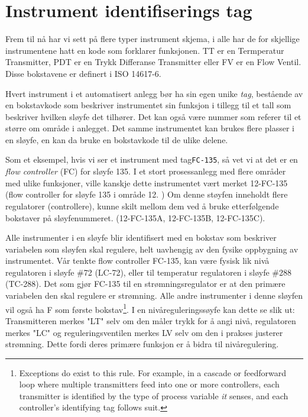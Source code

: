 \filbreak
\section{Instrument identifiserings tag} 

Frem til nå har vi sett på flere typer instrument skjema, i alle har de for skjellige instrumentene hatt en kode som forklarer funksjonen. TT er en Termperatur Transmitter, PDT er en Trykk Differanse Transmitter eller FV er en Flow Ventil. Disse bokstavene er definert i ISO 14617-6. 

Hvert instrument i et automatisert anlegg bør ha sin egen unike \textit{tag}, bestående av en bokstavkode som beskriver instrumentet sin funksjon i tillegg til et tall som beskriver hvilken sløyfe det tilhører. Det kan også være nummer som referer til et større om område i anlegget. Det samme instrumentet kan brukes flere plasser i en sløyfe, en kan da bruke en bokstavkode til de ulike delene.  

Som et eksempel, hvis vi ser et instrument med tag\texttt{FC-135}, så vet vi at det er en \textit{flow controller} (FC) for sløyfe 135. I et stort prosessanlegg med flere områder med ulike funksjoner, ville kanskje dette instrumentet vært merket 12-FC-135 (flow controller for sløyfe 135 i område 12. ) Om denne støyfen inneholdt flere regulatorer (controllere), kunne skilt mellom dem ved å bruke etterfølgende bokstaver på sløyfenummeret. (12-FC-135A, 12-FC-135B, 12-FC-135C). 

Alle instrumenter i en sløyfe blir identifisert med en bokstav som beskriver variabelen som sløyfen skal regulere, helt uavhengig av den fysike oppbygning av instrumentet. Vår tenkte flow controller FC-135, kan være fysisk lik nivå regulatoren i sløyfe \#72 (LC-72), eller til temperatur regulatoren i sløyfe \#288 (TC-288). Det som gjør FC-135 til en strømningsregulator er at den primære variabelen den skal regulere er strømning. Alle andre instrumenter i denne sløyfen vil også ha F som første bokstav\footnote{Exceptions do exist to this rule.  For example, in a cascade or feedforward loop where multiple transmitters feed into one or more controllers, each transmitter is identified by the type of process variable \textit{it} senses, and each controller's identifying tag follows suit.}. I en nivåreguleringssøyfe kan dette se slik ut: Transmitteren merkes "LT" selv om den måler trykk for å angi nivå, regulatoren merkes "LC" og reguleringsventilen merkes LV selv om den i prakses justerer strømning. Dette fordi deres primære funksjon er å bidra til nivåregulering. 

